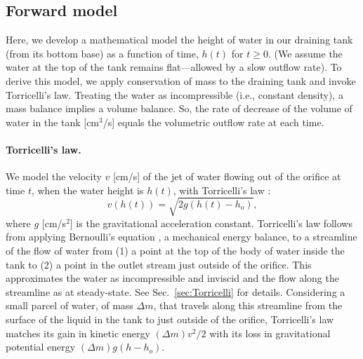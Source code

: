 \documentclass[a4paper,fleqn]{cas-dc}
\begin{document}
\subsection{Forward model} \label{sec:forward_model}
Here, we develop a mathematical model the height of water in our draining tank (from its bottom base) as a function of time, $h(t)$ for $t\geq 0$.
(We assume the water at the top of the tank remains flat---allowed by a slow outflow rate). 
To derive this model, we apply conservation of mass to the draining tank and invoke Torricelli's law.
Treating the water as incompressible (i.e., constant density), a mass balance implies a volume balance.
So, the rate of decrease of the volume of water in the tank [cm$^3$/s] equals the volumetric outflow rate at each time. 

\paragraph{Torricelli's law.}
We model the velocity $v$ [cm/s] of the jet of water flowing out of the orifice at time $t$, when the water height is $h(t)$, with Torricelli's law \cite{d2021torricelli}:
\begin{equation}
	v\left(h(t) \right) =  \sqrt{2 g(h(t)-h_o)}, \label{eq:Torricelli}
\end{equation} where $g$ [cm/s$^2$] is the gravitational acceleration constant. 
Torricelli's law follows from applying Bernoulli's equation \cite{welty2020fundamentals}, a mechanical energy balance, to a streamline of the flow of water from (1) a point at the top of the body of water inside the tank to (2) a point in the outlet stream just outside of the orifice. 
This approximates the water as incompressible and inviscid and the flow along the streamline as at steady-state. See Sec.~\ref{sec:Torricelli} for details.
Considering a small parcel of water, of mass $\Delta m$, that travels along this streamline from the surface of the liquid in the tank to just outside of the orifice,
Torricelli's law matches its gain in kinetic energy $(\Delta m) v^2/2$ with its loss in gravitational potential energy $(\Delta m)g(h-h_o)$.
\cite{groetsch1993inverse_tl,driver1998torricelli,williams2021vessel,epple2017verification}
\end{document}
